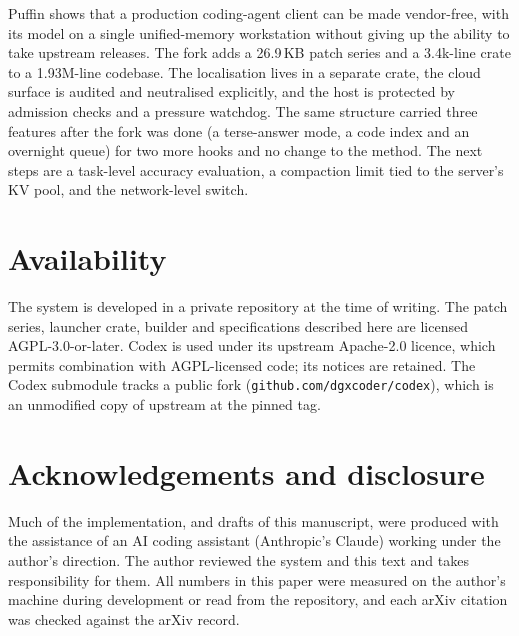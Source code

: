 \documentclass[11pt]{article}
\newcommand{\code}[1]{\texttt{#1}}
\begin{document}
Puffin shows that a production coding-agent client can be made vendor-free, with its model on a single
unified-memory workstation without giving up the ability to take upstream releases. The fork adds
a 26.9\,KB patch series and a 3.4k-line crate to a 1.93M-line codebase. The localisation lives in a separate crate, the cloud
surface is audited and neutralised explicitly, and the host is protected by admission checks and a
pressure watchdog. The same structure carried three features after the fork was done (a
terse-answer mode, a code index and an overnight queue) for two more hooks and no change to the
method. The next steps are a task-level accuracy evaluation, a compaction limit tied to the
server's KV pool, and the network-level switch.

\section*{Availability}
The system is developed in a private repository at the time of writing. The patch series, launcher
crate, builder and specifications described here are licensed AGPL-3.0-or-later. Codex is used
under its upstream Apache-2.0 licence, which permits combination with AGPL-licensed code; its
notices are retained. The Codex submodule tracks a public fork (\code{github.com/dgxcoder/codex}),
which is an unmodified copy of upstream at the pinned tag.

\section*{Acknowledgements and disclosure}
Much of the implementation, and drafts of this manuscript, were produced with the assistance of
an AI coding assistant (Anthropic's Claude) working under the author's direction. The author
reviewed the system and this text and takes responsibility for them. All numbers in this paper
were measured on the author's machine during development or read from the repository, and each
arXiv citation was checked against the arXiv record.



\end{document}

